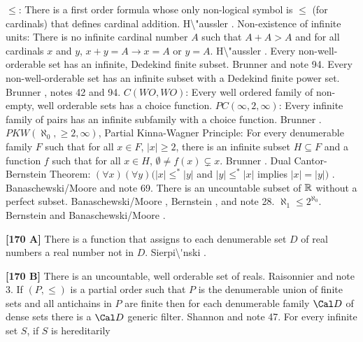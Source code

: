 $\le$: There is a first order formula whose only non-logical symbol is $\le$
(for cardinals) that defines cardinal addition. \ac{H\"aussler} \cite{1983}.
\medskip
{} Non-existence of infinite units: There is no
infinite cardinal number $A$ such that $A + A > A$  and for all cardinals
$x$ and $y$, $x + y = A\rightarrow x = A$ or $y = A$. \ac{H\"aussler}
\cite{1983}.
\medskip
{}  Every non-well-orderable set has an infinite,
Dedekind finite subset.  \ac{Brunner} \cite{1982a} and note 94.
\medskip
{} Every non-well-orderable set has an infinite subset
with a Dedekind finite power set. \ac{Brunner} \cite{1982a}, notes 42
and 94.
\medskip
{}  $C(WO,WO)$:  Every well ordered family of
non-empty, well orderable sets has a choice function.
\medskip
{} $PC(\infty,2,\infty)$: Every infinite family of
pairs has an infinite subfamily with a choice function. \ac{Brunner}
\cite{1982a}.
\medskip
{} $PKW(\aleph_{0},\ge 2,\infty)$, Partial
Kinna-Wagner Principle:  For every denumerable family $F$ such that for
all $x\in F$, $|x|\ge 2$, there is an infinite subset $H\subseteq F$ and
a function $f$ such that for all $x\in H$, $\emptyset\neq f(x)
\subsetneq x$. \ac{Brunner} \cite{1982a}.
\medskip
{}  Dual Cantor-Bernstein Theorem: $(\forall x)
(\forall y)(|x| \le^*|y|$ and $|y|\le^* |x|$ implies  $|x| = |y|)$ .
\ac{Banaschewski/Moore} \cite{1990} and note 69.
\medskip
{} There is an uncountable subset of ${\Bbb R}$
without a perfect subset. \ac{Banaschewski/Moore} \cite{1990},
\ac{Bernstein} \cite{1908}, and note 28.
\medskip
{} $\aleph_{1}\le 2^{\aleph_{0}}$. \ac{Bernstein}
\cite{1908} and \ac{Banaschewski/Moore} \cite{1990}.
\smallskip
\item{}{\bf [170 A]}  There is a function that assigns to each  denumerable
set $D$ of real numbers a real number not in $D$.  \ac{Sierpi\'nski}
\cite{1954}.
\smallskip
\item{}{\bf [170 B]}  There is an uncountable, well orderable set of
reals.  \ac{Raisonnier} \cite{1982} and note 3.
\medskip
{} If $(P,\le)$ is a partial order such that $P$ is
the denumerable union of finite sets and all antichains in $P$ are finite
then for each denumerable family ${\Cal D}$ of dense sets there is a
${\Cal D}$ generic filter.  \ac{Shannon} \cite{1990} and note 47.
\medskip
{} For every infinite set $S$, if $S$ is hereditarily
